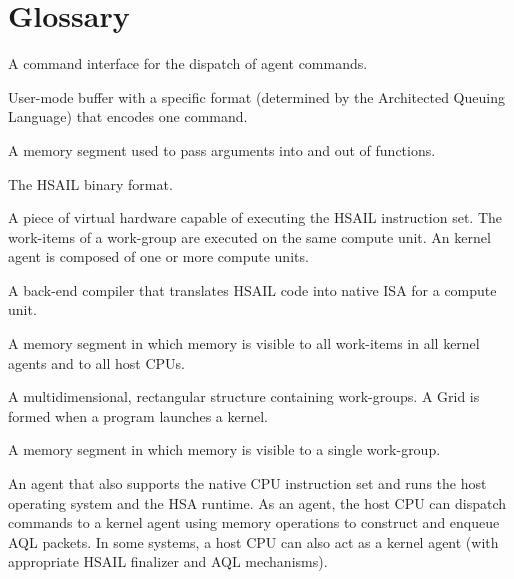 \documentclass[oneside]{book}
\begin{document}
%



\appendix
\chapter{Glossary}
\begin{description}[itemsep=5pt,leftmargin=0cm, labelindent=0cm]

\item[Architected Queuing Language (AQL)] A command interface for the dispatch
  of agent commands.

\item[AQL packet] User-mode buffer with a specific format (determined by the
  Architected Queuing Language) that encodes one command.

\item[Arg segment] A memory segment used to pass arguments into and out of
  functions.

\item[BRIG] The HSAIL binary format.

\item[Compute unit] A piece of virtual hardware capable of executing the HSAIL
  instruction set. The work-items of a work-group are executed on the same
  compute unit. An kernel agent is composed of one or more compute units.

\item[Finalizer] A back-end compiler that translates HSAIL code into native ISA
  for a compute unit.

\item[Global segment] A memory segment in which memory is visible to all
  work-items in all kernel agents and to all host CPUs.

\item[Grid] A multidimensional, rectangular structure containing work-groups. A
  Grid is formed when a program launches a kernel.

\item[Group segment] A memory segment in which memory is visible to a single
  work-group.

\item[Host CPU] An agent that also supports the native CPU instruction set
  and runs the host operating system and the HSA runtime. As an agent, the
  host CPU can dispatch commands to a kernel agent using memory operations to
  construct and enqueue AQL packets. In some systems, a host CPU can also act as
  a kernel agent (with appropriate HSAIL finalizer and AQL mechanisms).


\end{description}
\end{document}
